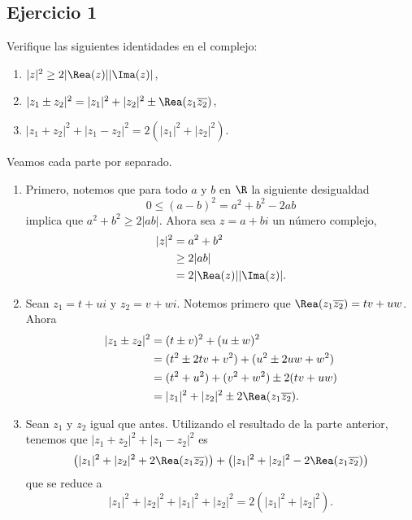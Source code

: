
 

\subsection*{Ejercicio 1}
	Verifique las siguientes identidades en el complejo:
	\begin{enumerate}
		\item $|z|^2 \geq 2|\Rea(z)||\Ima(z)|$,
		\item $|z_1\pm z_2|^2 = |z_1|^2 + |z_2|^2 \pm \Rea(z_1\overline{z_2})$,
		\item $|z_1+z_2|^2 + |z_1-z_2|^2 = 2(|z_1|^2+|z_2|^2)$.
	\end{enumerate}
\begin{sol}
	Veamos cada parte por separado.
	\begin{enumerate}
		\item Primero, notemos que para todo $a$ y $b$ en $\R$ la siguiente desigualdad
		\[ 0\leq (a-b)^2 = a^2+b^2-2ab \]
		implica que $a^2+b^2\geq 2|ab|$. Ahora sea $z=a+bi$ un número complejo, 
		\begin{align*}
			|z|^2 &= a^2+b^2 \\
				  &\geq 2|ab| \\
				  &= 2|\Rea(z)||\Ima(z)|.
		\end{align*}
		\item Sean $z_1=t+ui$ y $z_2=v+wi$. Notemos primero que $\Rea(z_1\overline{z_2}) = tv+uw$. Ahora
		\begin{align*}
			|z_1\pm z_2|^2 &= (t\pm v)^2 + (u\pm w)^2 \\
						   &= (t^2\pm 2tv + v^2) + (u^2\pm 2uw + w^2) \\
						   &= (t^2+u^2) + (v^2+w^2) \pm 2(tv+uw) \\
						   &= |z_1|^2 + |z_2|^2 \pm 2\Rea(z_1\overline{z_2}).
		\end{align*}
		\item Sean $z_1$ y $z_2$ igual que antes. Utilizando el resultado de la parte anterior, tenemos que $|z_1+z_2|^2 + |z_1-z_2|^2$ es
		\[ \big(|z_1|^2 + |z_2|^2 + 2\Rea(z_1\overline{z_2})\big) + \big( |z_1|^2 + |z_2|^2 - 2\Rea(z_1\overline{z_2}) \big) \]
		que se reduce a
		\[ |z_1|^2 + |z_2|^2 + |z_1|^2 + |z_2|^2 =  2(|z_1|^2+|z_2|^2). \]
	\end{enumerate}
\end{sol}
